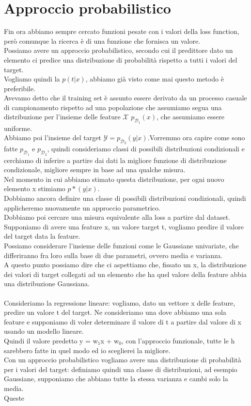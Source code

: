 \documentclass[12pt, oneside]{extbook}
\begin{document}
\section{Approccio probabilistico}
Fin ora abbiamo sempre cercato funzioni pesate con i valori della loss function, però comunque la ricerca è di una funzione che fornisca un valore.\\Possiamo avere un approccio probabilistico, secondo cui il predittore dato un elemento ci predice una distribuzione di probabilità rispetto a tutti i valori del target.\\Vogliamo quindi la $p(t|x)$, abbiamo già visto come mai questo metodo è preferibile.\\Avevamo detto che il training set è assunto essere derivato da un processo casuale di campionamento rispetto ad una popolazione che assumiamo segua una distribuzione per l'insieme delle feature $\mathscr{X}$ $p_{\mathscr{D}_1}(x)$, che assumiamo essere uniforme.\\Abbiamo poi l'insieme del target $\mathscr{Y} = p_{\mathscr{D}_2}(y|x)$.Vorremmo ora capire come sono fatte $p_{\mathscr{D}_1}$ e $p_{\mathscr{D}_2}$, quindi consideriamo classi di possibili distribuzioni condizionali e cerchiamo di inferire a partire dai dati la migliore funzione di distribuzione condizionale, migliore sempre in base ad una qualche misura.\\Nel momento in cui abbiamo stimato questa distribuzione, per ogni nuovo elemento x stimiamo $p*(y|x)$.\\Dobbiamo ancora definire una classe di possibili distribuzioni condizionali, quindi applicheremo nuovamente un approccio parametrico.\\Dobbiamo poi cercare una misura equivalente alla loss a partire dal dataset.\\Supponiamo di avere una feature x, un valore target t, vogliamo predire il valore del target data la feature.\\Possiamo considerare l'insieme delle funzioni come le Gaussiane univariate, che differiranno fra loro sulla base di due parametri, ovvero media e varianza.\\A questo punto possiamo dire che ci aspettiamo che, fissato un x, la distribuzione dei valori di target collegati ad un elemento che ha quel valore della feature abbia una distribuzione Gaussiana.\\\\Consideriamo la regressione lineare: vogliamo, dato un vettore x delle feature, predire un valore t del target. Ne consideriamo una dove abbiamo una sola feature e supponiamo di voler determinare il valore di t a partire dal valore di x usando un modello lineare.\\Quindi il valore predetto y = w$_1$x + w$_0$, con l'approccio funzionale, tutte le h sarebbero fatte in quel modo ed io sceglierei la migliore.\\Con un approccio probabilistico vogliamo avere una distribuzione di probabilità per i valori del target: definiamo quindi una classe di distribuzioni, ad esempio Gaussiane, supponiamo che abbiano tutte la stessa varianza e cambi solo la media.\\Queste 
\end{document}
